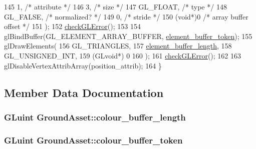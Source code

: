 \begin{DoxyCode}
145     1,        \textcolor{comment}{/* attribute */}
146     3,        \textcolor{comment}{/* size */}
147     GL\_FLOAT,   \textcolor{comment}{/* type */}
148     GL\_FALSE,   \textcolor{comment}{/* normalized? */}
149     0,        \textcolor{comment}{/* stride */}
150     (\textcolor{keywordtype}{void}*)0    \textcolor{comment}{/* array buffer offset */}
151   );
152   \hyperlink{GroundAsset_8cc_a75f201b0e53e68726854997957322b8d}{checkGLError}();
153 
154   glBindBuffer(GL\_ELEMENT\_ARRAY\_BUFFER, \hyperlink{classGroundAsset_af9612e4d7ba49cbacc2ee93266c2b89e}{element\_buffer\_token});
155   glDrawElements(
156     GL\_TRIANGLES,
157     \hyperlink{classGroundAsset_a68cd956ec94f65cd5def56e3e442cd55}{element\_buffer\_length},
158     GL\_UNSIGNED\_INT,
159     (GLvoid*) 0
160   );
161   \hyperlink{GroundAsset_8cc_a75f201b0e53e68726854997957322b8d}{checkGLError}();
162 
163   glDisableVertexAttribArray(position\_attrib);
164 \}
\end{DoxyCode}


\subsection{Member Data Documentation}
\hypertarget{classGroundAsset_aa7808332316a2ba6f7fd0efd7ec5bdb2}{}
\subsubsection[{colour\+\_\+buffer\+\_\+length}]{\setlength{\rightskip}{0pt plus 5cm}G\+Luint Ground\+Asset\+::colour\+\_\+buffer\+\_\+length\hspace{0.3cm}{\ttfamily [private]}}\label{classGroundAsset_aa7808332316a2ba6f7fd0efd7ec5bdb2}
\hypertarget{classGroundAsset_acae5e4f08e295851822c3dbb3c10f2ee}{}
\subsubsection[{colour\+\_\+buffer\+\_\+token}]{\setlength{\rightskip}{0pt plus 5cm}G\+Luint Ground\+Asset\+::colour\+\_\+buffer\+\_\+token\hspace{0.3cm}{\ttfamily [private]}}\label{classGroundAsset_acae5e4f08e295851822c3dbb3c10f2ee}
\hypertarget{classGroundAsset_a68cd956ec94f65cd5def56e3e442cd55}{}
